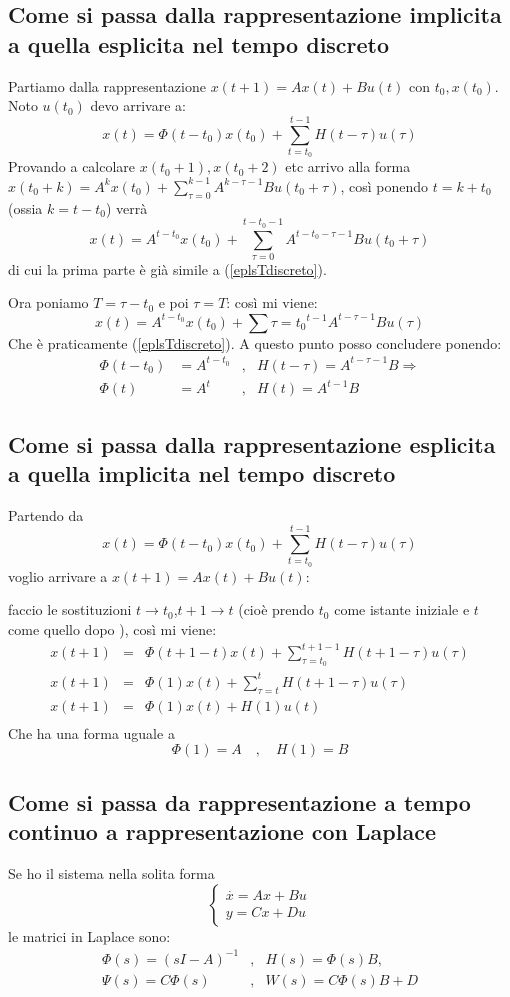 \documentclass{article}
\begin{document}
\subsection{Come si passa dalla rappresentazione implicita a quella esplicita nel tempo discreto}
Partiamo dalla rappresentazione $x(t+1) = Ax(t)+Bu(t)$ con $t_0,x(t_0)$.
Noto $u(t_0)$ devo arrivare a: 
\begin{equation}\label{eplsTdiscreto}
    x(t) = \Phi(t-t_0)x(t_0)+\sum_{t=t_0}^{t-1}H(t-\tau)u(\tau)
\end{equation}
Provando a calcolare $x(t_0+1),x(t_0+2)$ etc arrivo alla forma
$x(t_0+k) = A^kx(t_0)+\sum_{\tau = 0}^{k-1}A^{k-\tau-1}B u(t_0+\tau)$,
così ponendo $t=k+t_0$ (ossia $k=t-t_0$) verrà
\[
x(t) =A^{t-t_0}x(t_0) +\sum_{\tau=0}^{t-t_0-1}A^{t-t_0-\tau-1}B u(t_0+\tau)   
\]
di cui la prima parte è già simile a (\ref{eplsTdiscreto}).

Ora poniamo $T = \tau-t_0$ e poi $\tau=T$: così mi viene:
\[
    x(t) =A^{t-t_0}x(t_0)+\sum{\tau=t_0}^{t-1}A^{t-\tau-1}Bu(\tau)
\]
Che è praticamente (\ref{eplsTdiscreto}). A questo punto posso concludere ponendo:
\begin{align*}
\Phi(t-t_0)&=A^{t-t_0} &,& H(t-\tau) = A^{t-\tau-1}B \Longrightarrow\\
\Phi(t) &= A^t &,&H(t)= A^{t-1}B
\end{align*}


\subsection{Come si passa dalla rappresentazione esplicita a quella implicita nel tempo discreto}

Partendo da
\[
    x(t) = \Phi(t-t_0)x(t_0)+\sum_{t=t_0}^{t-1}H(t-\tau)u(\tau)
\]
voglio arrivare a $x(t+1) = Ax(t)+Bu(t)$: 

faccio le sostituzioni $t\to t_0$,$t+1\to t$ (cioè prendo $t_0$ come istante iniziale e $t$ come quello dopo ),
così mi viene:
\begin{align*}
    x(t+1) &=& \Phi(t+1-t)x(t)+\sum_{\tau=t_0}^{t+1-1}H(t+1-\tau)u(\tau)\\
    x(t+1) &=& \Phi(1)x(t)+\sum_{\tau=t}^{t}H(t+1-\tau)u(\tau)\\
    x(t+1) &=& \Phi(1)x(t) +H(1)u(t)\\
\end{align*}
Che ha una forma uguale a
\[\Phi(1) =A \quad,\quad H(1)=B\]



\subsection{Come si passa da rappresentazione a tempo continuo a rappresentazione con Laplace}
Se ho il sistema nella solita forma
\[\begin{cases}\overset{\cdot}{x} = Ax+Bu\\y = Cx+Du \end{cases}\]
le matrici in Laplace sono:
\begin{align*}
     \Phi(s) = (sI-A)^{-1}&,&  H(s) = \Phi(s)B,\\
     \Psi(s) = C \Phi(s)&,& W(s)=C\Phi(s)B+D 
\end{align*}
\end{document}
